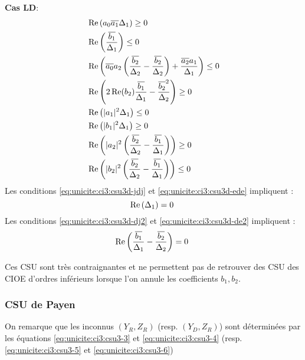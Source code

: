 			\begin{minipage}{0.49\textwidth}
				\textbf{Cas LD}:
				\begin{align}
					\label{eq:unicite:ci3:csu3d-j2}&\Re\left(a_0\conj{a_1}\Delta_1\right) \ge 0 \\
					\label{eq:unicite:ci3:csu3d-e2}&\Re\left(\frac{\conj{b_1}}{\Delta_1}\right) \le 0 \\
					\label{eq:unicite:ci3:csu3d-jrj}&\Re\left(\conj{a_0}a_2\left(\frac{\conj{b_2}}{\Delta_2}-\frac{\conj{b_2}}{\Delta_2}\right) + \frac{\conj{a_2}a_1}{\Delta_1} \right)\le 0\\
					\label{eq:unicite:ci3:csu3d-ere}&\Re\left(2\Re(b_2)\frac{\conj{b_1}}{\Delta_1}-\frac{\conj{b_2}^2}{\Delta_2}\right) \ge 0\\
					\label{eq:unicite:ci3:csu3d-jdj}&\Re\left(|a_1|^2\Delta_1\right) \le 0 \\
					\label{eq:unicite:ci3:csu3d-ede}&\Re\left(|b_1|^2\Delta_1\right) \ge 0 \\
					\label{eq:unicite:ci3:csu3d-dj2}&\Re\left(|a_2|^2\left(\frac{\conj{b_2}}{\Delta_2}-\frac{\conj{b_1}}{\Delta_1}\right)\right)\ge 0\\
					\label{eq:unicite:ci3:csu3d-de2}&\Re\left(|b_2|^2\left(\frac{\conj{b_2}}{\Delta_2}-\frac{\conj{b_1}}{\Delta_1}\right)\right)\le 0
				\end{align}
				Les conditions \eqref{eq:unicite:ci3:csu3d-jdj} et \eqref{eq:unicite:ci3:csu3d-ede} impliquent :
				\begin{equation}
					\Re\left(\Delta_1\right) = 0\\\
				\end{equation}
				Les conditions \eqref{eq:unicite:ci3:csu3d-dj2} et \eqref{eq:unicite:ci3:csu3d-de2} impliquent :
				\begin{equation}
					\Re\left(\frac{\conj{b_1}}{\Delta_1}-\frac{\conj{b_2}}{\Delta_2}\right) = 0\\\
				\end{equation}
			\end{minipage}

			Ces CSU sont très contraignantes et ne permettent pas de retrouver des CSU des CIOE d'ordres inférieurs lorsque l'on annule les coefficients \(b_1, b_2\).


		\subsubsection{CSU de Payen}
			On remarque que les inconnus \((Y_R,Z_R)\) (resp. \((Y_D,Z_R)\)) sont déterminées par les équations \eqref{eq:unicite:ci3:csu3-3} et \eqref{eq:unicite:ci3:csu3-4} (resp. \eqref{eq:unicite:ci3:csu3-5} et \eqref{eq:unicite:ci3:csu3-6})

